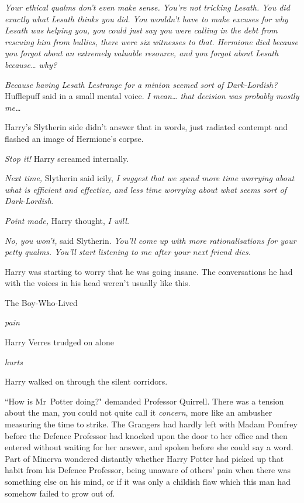 \emph{Your ethical qualms don't even make sense. You're not tricking Lesath. You did exactly what Lesath thinks you did. You wouldn't have to make excuses for why Lesath was helping you, you could just say you were calling in the debt from rescuing him from bullies, there were six witnesses to that. Hermione died because you forgot about an extremely valuable resource, and you forgot about Lesath because{\ldots} why?}

\emph{Because having Lesath Lestrange for a minion seemed sort of Dark-Lordish?} Hufflepuff said in a small mental voice. \emph{I mean{\ldots} that decision was probably mostly me{\ldots}}

Harry's Slytherin side didn't answer that in words, just radiated contempt and flashed an image of Hermione's corpse.

\emph{Stop it!} Harry screamed internally.

\emph{Next time,} Slytherin said icily, \emph{I suggest that we spend more time worrying about what is efficient and effective, and less time worrying about what seems sort of Dark-Lordish.}

\emph{Point made,} Harry thought, \emph{I will.}

\emph{No, you won't,} said Slytherin. \emph{You'll come up with more rationalisations for your petty qualms. You'll start listening to me after your \emph{next} friend dies.}

Harry was starting to worry that he was going insane. The conversations he had with the voices in his head weren't usually like this.

The Boy-Who-Lived

\emph{pain}

Harry Verres trudged on alone

\emph{hurts}

Harry walked on through the silent corridors.

\later

``How is Mr~Potter doing?" demanded Professor Quirrell. There was a tension about the man, you could not quite call it \emph{concern}, more like an ambusher measuring the time to strike. The Grangers had hardly left with Madam Pomfrey before the Defence Professor had knocked upon the door to her office and then entered without waiting for her answer, and spoken before she could say a word. Part of Minerva wondered distantly whether Harry Potter had picked up that habit from his Defence Professor, being unaware of others' pain when there was something else on his mind, or if it was only a childish flaw which this man had somehow failed to grow out of.

